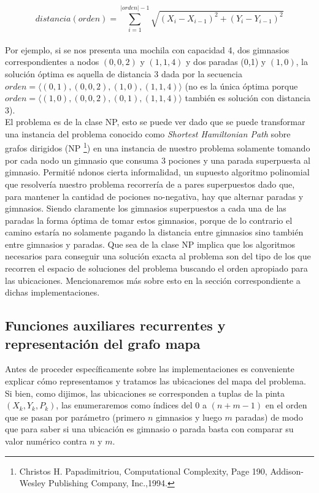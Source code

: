    $$ distancia(orden) = \sum_{i=1}^{|orden|-1} \sqrt{(X_i - X_{i-1})^2 + (Y_i - Y_{i-1})^2} $$
   \\

   Por ejemplo, si se nos presenta una mochila con capacidad 4, dos gimnasios correspondientes a nodos $(0,0,2)$ y $(1,1,4)$ y dos paradas (0,1) y $(1,0)$, la solución óptima es aquella de distancia 3 dada por la secuencia $orden =\langle {(0,1), (0,0,2), (1,0), (1,1,4)} \rangle$ (no es la única óptima porque $orden = \langle {(1,0), (0,0,2), (0,1), (1,1,4)} \rangle$ también es solución con distancia 3).
   \\

   El problema es de la clase NP, esto se puede ver dado que se puede transformar una instancia del problema conocido como \emph{Shortest Hamiltonian Path} sobre grafos dirigidos (NP \footnote{Christos H. Papadimitriou, Computational Complexity, Page 190, Addison-Wesley Publishing Company, Inc.,1994.}) en una instancia de nuestro problema solamente tomando por cada nodo un gimnasio que consuma 3 pociones y una parada superpuesta al gimnasio. Permitié ndonos cierta informalidad, un supuesto algoritmo polinomial que resolvería nuestro problema recorrería de a pares superpuestos dado que, para mantener la cantidad de pociones no-negativa, hay que alternar paradas y gimnasios. Siendo claramente los gimnasios superpuestos a cada una de las paradas la forma óptima de tomar estos gimnasios, porque de lo contrario el camino estaría no solamente pagando la distancia entre gimnasios sino también entre gimnasios y paradas. Que sea de la clase NP implica que los algoritmos necesarios para conseguir una solución exacta al problema son del tipo de los que recorren el espacio de soluciones del problema buscando el orden apropiado para las ubicaciones. Mencionaremos más sobre esto en la sección correspondiente a dichas implementaciones.

   \subsection{Funciones auxiliares recurrentes y representación del grafo mapa}

   Antes de proceder específicamente sobre las implementaciones es conveniente explicar cómo representamos y tratamos las ubicaciones del mapa del problema. Si bien, como dijimos, las ubicaciones se corresponden a tuplas de la pinta $(X_k, Y_k, P_k)$, las enumeraremos como índices del 0 a $(n + m - 1)$ en el orden que se pasan por parámetro (primero $n$ gimnasios y luego $m$ paradas) de modo que para saber si una ubicación es gimnasio o parada basta con comparar su valor numérico contra $n$ y $m$.
   \\

